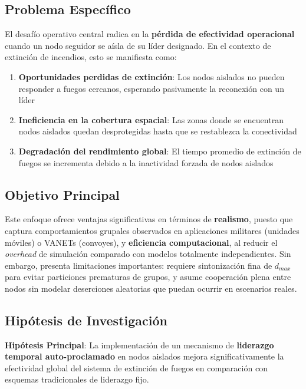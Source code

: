 \documentclass{article}
\begin{document}
\subsection{Problema Específico}
El desafío operativo central radica en la \textbf{pérdida de efectividad operacional} cuando un nodo seguidor se aísla de su líder designado. En el contexto de extinción de incendios, esto se manifiesta como:

\begin{enumerate}
    \item \textbf{Oportunidades perdidas de extinción}: Los nodos aislados no pueden responder a fuegos cercanos, esperando pasivamente la reconexión con un líder

    \item \textbf{Ineficiencia en la cobertura espacial}: Las zonas donde se encuentran nodos aislados quedan desprotegidas hasta que se restablezca la conectividad

    \item \textbf{Degradación del rendimiento global}: El tiempo promedio de extinción de fuegos se incrementa debido a la inactividad forzada de nodos aislados
\end{enumerate}

\subsection{Objetivo Principal}
Este enfoque ofrece ventajas significativas en términos de \textbf{realismo}, puesto que captura comportamientos grupales observados en aplicaciones militares (unidades móviles) o VANETs (convoyes), y \textbf{eficiencia computacional}, al reducir el \textit{overhead} de simulación comparado con modelos totalmente independientes. Sin embargo, presenta limitaciones importantes: requiere sintonización fina de $d_{max}$ para evitar particiones prematuras de grupos, y asume cooperación plena entre nodos sin modelar deserciones aleatorias que puedan ocurrir en escenarios reales.


\subsection{Hipótesis de Investigación}
\textbf{Hipótesis Principal}: La implementación de un mecanismo de \textbf{liderazgo temporal auto-proclamado} en nodos aislados mejora significativamente la efectividad global del sistema de extinción de fuegos en comparación con esquemas tradicionales de liderazgo fijo.
\end{document}
